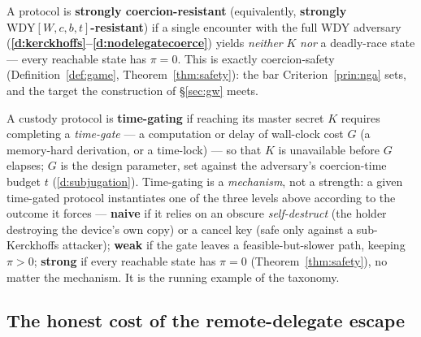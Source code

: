 \begin{definition}\label{def:strong-cr}
A protocol is \textbf{strongly coercion-resistant} (equivalently, \textbf{strongly
$\mathrm{WDY}[W,c,b,t]$-resistant}) if a single encounter with the full WDY
adversary (\textbf{\ref{d:kerckhoffs}--\ref{d:nodelegatecoerce}}) yields \emph{neither} $K$ \emph{nor} a deadly-race
state --- every reachable state has $\pi = 0$. This is exactly coercion-safety
(Definition~\ref{def:game}, Theorem~\ref{thm:safety}): the bar
Criterion~\ref{prin:nga} sets, and the target the construction of \S\ref{sec:gw}
meets.
\end{definition}

\begin{definition}\label{def:timegate}
A custody protocol is \textbf{time-gating} if reaching its master secret $K$
requires completing a \emph{time-gate} --- a computation or delay of wall-clock
cost $G$ (a memory-hard derivation, or a time-lock) --- so that $K$ is unavailable
before $G$ elapses; $G$ is the design parameter, set against the adversary's
coercion-time budget $t$ (\ref{d:subjugation}). Time-gating is a \emph{mechanism}, not a strength:
a given time-gated protocol instantiates one of the three levels above according
to the outcome it forces --- \textbf{naive} if it relies on an obscure
\emph{self-destruct} (the holder destroying the device's own copy) or a cancel
key (safe only against a sub-Kerckhoffs attacker); \textbf{weak} if the gate
leaves a feasible-but-slower path, keeping $\pi > 0$; \textbf{strong} if every
reachable state has $\pi = 0$ (Theorem~\ref{thm:safety}), no matter the mechanism.
It is the running example of the taxonomy.
\end{definition}

\subsection{The honest cost of the remote-delegate escape}
\label{app:chain-r2}


